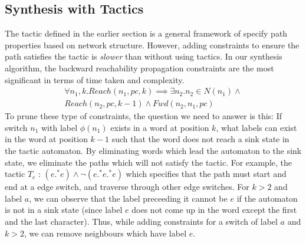 \documentclass[]{sig}
\begin{document}
\subsection{Synthesis with Tactics}
The tactic defined in the earlier section is a general framework of specify path properties based on network structure. However, adding constraints to ensure the path satisfies the tactic is \emph{slower} than without using tactics. In our synthesis algorithm, the backward reachability propagation constraints are the most significant in terms of time taken and complexity. 
\begin{multline}
\forall n_1,k.  Reach(n_1,pc,k) \implies \exists n_2.  n_2 \in N(n_1) \wedge \\ Reach(n_2,pc,k-1) \wedge Fwd(n_2,n_1,pc)
\end{multline} 
To prune these type of constraints, the question we need to answer is this: If switch $n_1$ with label $\phi(n_1)$ exists in a word at position $k$, what labels can exist in the word at position $k - 1$ such that the word does not reach a sink state in the tactic automaton. By eliminating words which lead the automaton to the sink state, we eliminate the paths which will not satisfy the tactic. For example, the tactic $T_e$ : $(e .^* e) \wedge \neg (e .^* e .^* e)$ which specifies that the path must start and end at a edge switch, and traverse through other edge switches. For $k > 2$ and label $a$, we can observe that the label preceeding it cannot be $e$ if the automaton is not in a sink state (since label $e$ does not come up in the word except the first and the last character). Thus, while adding constraints for a switch of label $a$ and $k > 2$, we can remove neighbours which have label $e$.  
\end{document}
